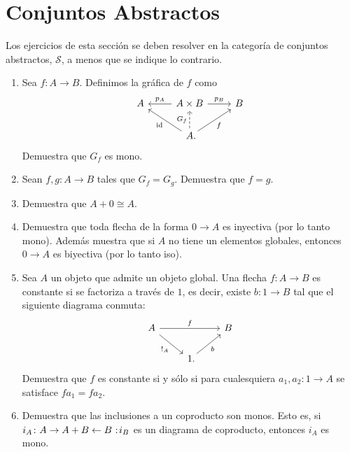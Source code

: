 \documentclass[11pt]{article}
\newcommand{\id}{\mathrm{id}}
\newcommand{\topos}[1]{\mathscr{#1}}
\newcommand{\noloc}{%
  \nobreak
  \mspace{6mu plus 1mu}
  {:}
  \nonscript\mkern-\thinmuskip
  \mathpunct{}
  \mspace{2mu}
}
\begin{document}
  \section*{Conjuntos Abstractos}
  Los ejercicios de esta sección se deben resolver en la categoría de conjuntos
  abstractos, \(\topos{S}\), a menos que se indique lo contrario.
  \begin{enumerate}[\bf\text{Ej.} 1.]
    \item Sea \(f\colon A\to B\). Definimos la gráfica de \(f\) como
      \begin{equation*}
        \begin{tikzcd}
          A & A\times B\ar{l}[swap]{p_A}\ar{r}{p_B} & B\\
          & A\mathrlap{.}\ar{ul}{\id}\ar{ur}[swap]{f}\ar[dashed]{u}{G_f}
        \end{tikzcd}
      \end{equation*}
      Demuestra que \(G_f\) es mono.

    \item Sean \(f,g\colon A\to B\) tales que \(G_f=G_g\). Demuestra que \(f=g\).
    
    \item Demuestra que \(A+0\cong A\).
    
    \item Demuestra que toda flecha de la forma \(0\to A\) es inyectiva (por lo
    tanto mono). Además muestra que si \(A\) no tiene un elementos globales, entonces
    \(0\to A\) es biyectiva (por lo tanto iso).
    
    \item Sea $A$ un objeto que admite un objeto global. Una flecha \(f\colon A\to B\) es constante si se factoriza a través de
    \(1\), es decir, existe \(b\colon 1\to B\) tal que el siguiente diagrama
    conmuta:
    \begin{equation*}
      \begin{tikzcd}
        A\ar{rr}{f}\ar{dr}[swap]{!_A} && B\\
        & 1\mathrlap{.}\ar{ur}[swap]{b}
      \end{tikzcd}
    \end{equation*}
    Demuestra que \(f\) es constante si y sólo si para cualesquiera 
    \(a_1,a_2\colon 1\to A\) se satisface \(fa_1 = fa_2\).

    \item Demuestra que las inclusiones a un coproducto son monos. Esto es, si 
    \(i_A\colon A\to A+B\leftarrow B\noloc i_B\) es un diagrama de coproducto,
    entonces \(i_A\) es mono.


\end{enumerate}
\end{document}
